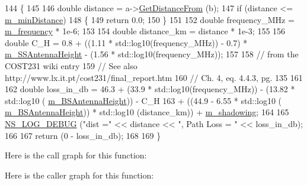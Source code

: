 \begin{DoxyCode}
144 \{
145 
146   \textcolor{keywordtype}{double} distance = a->\hyperlink{classns3_1_1MobilityModel_afa16c20b3c5fd135be075000f0272f31}{GetDistanceFrom} (b);
147   \textcolor{keywordflow}{if} (distance <= \hyperlink{classns3_1_1Cost231PropagationLossModel_ac4373b88bf096cdd4169ef5c8537b80e}{m\_minDistance})
148     \{
149       \textcolor{keywordflow}{return} 0.0;
150     \}
151 
152   \textcolor{keywordtype}{double} frequency\_MHz = \hyperlink{classns3_1_1Cost231PropagationLossModel_a397d2259ee4c845b903d6abed7b26683}{m\_frequency} * 1e-6;
153 
154   \textcolor{keywordtype}{double} distance\_km = distance * 1e-3;
155 
156   \textcolor{keywordtype}{double} C\_H = 0.8 + ((1.11 * std::log10(frequency\_MHz)) - 0.7) * 
      \hyperlink{classns3_1_1Cost231PropagationLossModel_a143ebc7328775a1c8b5c48ec12692dc1}{m\_SSAntennaHeight} - (1.56 * std::log10(frequency\_MHz));
157 
158   \textcolor{comment}{// from the COST231 wiki entry}
159   \textcolor{comment}{// See also http://www.lx.it.pt/cost231/final\_report.htm}
160   \textcolor{comment}{// Ch. 4, eq. 4.4.3, pg. 135}
161 
162   \textcolor{keywordtype}{double} loss\_in\_db = 46.3 + (33.9 * std::log10(frequency\_MHz)) - (13.82 * std::log10 (
      \hyperlink{classns3_1_1Cost231PropagationLossModel_ad564778df097fefd5c461ebc814f9d22}{m\_BSAntennaHeight})) - C\_H
163                                   + ((44.9 - 6.55 * std::log10 (
      \hyperlink{classns3_1_1Cost231PropagationLossModel_ad564778df097fefd5c461ebc814f9d22}{m\_BSAntennaHeight})) * std::log10 (distance\_km)) + \hyperlink{classns3_1_1Cost231PropagationLossModel_af6164bb5b4a4b4882061049be33bd5e1}{m\_shadowing};
164 
165   \hyperlink{group__logging_ga413f1886406d49f59a6a0a89b77b4d0a}{NS\_LOG\_DEBUG} (\textcolor{stringliteral}{"dist ="} << distance << \textcolor{stringliteral}{", Path Loss = "} << loss\_in\_db);
166 
167   \textcolor{keywordflow}{return} (0 - loss\_in\_db);
168 
169 \}
\end{DoxyCode}


Here is the call graph for this function\+:




Here is the caller graph for this function\+:


